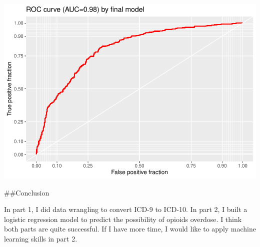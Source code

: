 \documentclass[
]{article}
\begin{document}
\includegraphics{Final-project_Annie-Lin-1_files/figure-latex/unnamed-chunk-15-2.pdf}

\#\#Conclusion

In part 1, I did data wrangling to convert ICD-9 to ICD-10. In part 2, I
built a logistic regression model to predict the possibility of opioids
overdose. I think both parts are quite successful. If I have more time,
I would like to apply machine learning skills in part 2.
\end{document}
